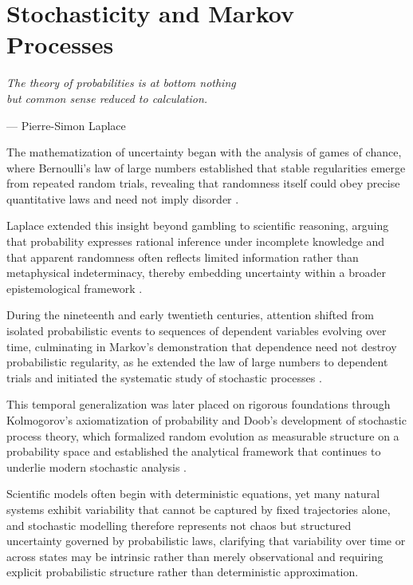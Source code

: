 
\chapter{Stochasticity and Markov Processes}
\label{chapter7}

\epigraph{\textit{The theory of probabilities is at bottom nothing\\but common sense reduced to calculation.}}{— Pierre-Simon Laplace}

The mathematization of uncertainty began with the analysis of games of chance, where Bernoulli’s law of large numbers established that stable regularities emerge from repeated random trials, revealing that randomness itself could obey precise quantitative laws and need not imply disorder \cite{bernoulli_1713_ars}. 

\medskip

Laplace extended this insight beyond gambling to scientific reasoning, arguing that probability expresses rational inference under incomplete knowledge and that apparent randomness often reflects limited information rather than metaphysical indeterminacy, thereby embedding uncertainty within a broader epistemological framework \cite{laplace_1812_theorie}. 

\medskip

During the nineteenth and early twentieth centuries, attention shifted from isolated probabilistic events to sequences of dependent variables evolving over time, culminating in Markov’s demonstration that dependence need not destroy probabilistic regularity, as he extended the law of large numbers to dependent trials and initiated the systematic study of stochastic processes \cite{markov_1906_extension}. 

\medskip

This temporal generalization was later placed on rigorous foundations through Kolmogorov’s axiomatization of probability and Doob’s development of stochastic process theory, which formalized random evolution as measurable structure on a probability space and established the analytical framework that continues to underlie modern stochastic analysis \cite{kolmogorov_1933_grundbegriffe,doob_1953_stochastic}. 

\medskip

Scientific models often begin with deterministic equations, yet many natural systems exhibit variability that cannot be captured by fixed trajectories alone, and stochastic modelling therefore represents not chaos but structured uncertainty governed by probabilistic laws, clarifying that variability over time or across states may be intrinsic rather than merely observational and requiring explicit probabilistic structure rather than deterministic approximation. 

